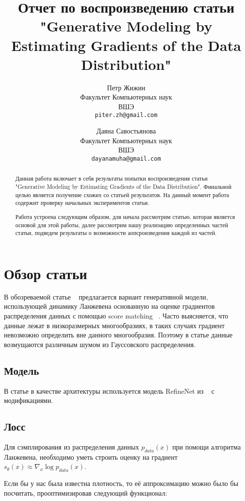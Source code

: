 \documentclass{article}
\title{Отчет по воспроизведению статьи "Generative Modeling by Estimating Gradients of the Data Distribution"}
\author{%
  Петр Жижин \\
  Факультет Компьютерных наук\\
  ВШЭ\\
  \texttt{piter.zh@gmail.com} \\
   \and
   Даяна Савостьянова \\
   Факультет Компьютерных наук\\
   ВШЭ\\
   \texttt{dayanamuha@gmail.com} \\
}
\begin{document}

\maketitle

\begin{abstract}
  Данная работа включает в себя результаты попытки воспроизведения статьи 
  "Generative Modeling by Estimating Gradients of the Data Distribution". Финальной целью является получение схожих со статьей результатов. На данный момент работа содержит проверку начальных экспериментов статьи.
  
  Работа устроена следующим образом, для начала рассмотрим статью, которая является основой для этой работы, далее рассмотрим нашу реализацию определенных частей статьи, подведем результаты о возможности аопсроизведения каждой из частей.
\end{abstract}


\section{Обзор статьи}

В обозреваемой статье ~\cite{DBLP:journals/corr/abs-1907-05600} предлагается вариант генеративной модели, использующей динамику Ланжевена основанную на оценке градиентов распределения данных с помощью score matching ~\cite{DBLP:journals/corr/abs-1907-05600}. Часто выясняется, что данные лежат в низкоразмерных многообразиях, в таких случаях градиент невозможно определить вне данного многообразия. Поэтому в статье данные возмущаются различным шумом из Гауссовского распределения.

\subsection{Модель}

В статье в качестве архитектуры используется модель RefineNet из ~\cite{DBLP:journals/corr/LinMS016} с модификациями.


\subsection{Лосс}

Для сэмплирования из распределения данных $p_{data}(x)$ при помощи алгоритма
Ланжевена, необходимо уметь строить оценку на градиент
$s_{\theta}(x) \approx \nabla_x \log p_{data}(x)$.

Если бы у нас была известна плотность, то её аппроксимацию можно было бы
посчитать, прооптимизировав следующий функционал:
\end{document}
